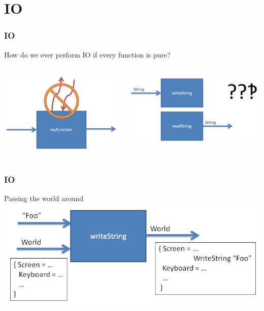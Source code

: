 \documentclass{beamer}
\begin{document}
\section{IO}
\begin{frame}
\frametitle{IO}

 How do we ever perform IO if every function is pure?
  \vspace{1cm}
  \begin{columns}[]
   \begin{column}[]{5cm}
    \includegraphics[width=1\linewidth]{figs/pure}
   \end{column}
   \begin{column}[]{5cm}
    \includegraphics[width=1.1\linewidth]{figs/readWrite}
   \end{column}
  \end{columns}

\end{frame}

\begin{frame}
\frametitle{IO}
 Passing the world around 
 \includegraphics[width=1\linewidth]{figs/world}
\end{frame}
\end{document}
